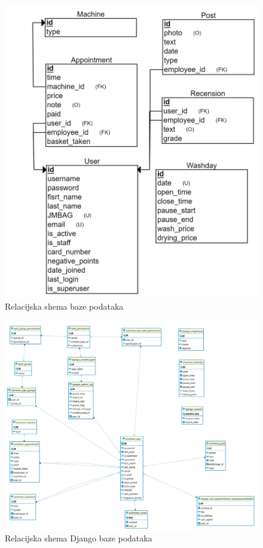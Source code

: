 				\begin{figure}[H]
					\includegraphics[scale=0.2]{slike/BAZA.PNG} %
					\centering
					\caption{Relacijska shema baze podataka}
					\label{fig:promjene}
				\end{figure}
			\eject
			
			
			\begin{figure}[H]
				\includegraphics[scale=0.3]{slike/djangoBaza.jpeg} %
				\centering
				\caption{Relacijska shema Django baze podataka}
				\label{fig:promjene}
			\end{figure}
			\eject
			
